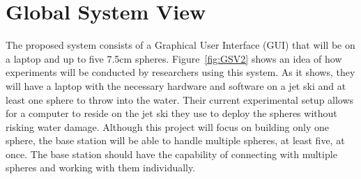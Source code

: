 \section{Global System View}
%
%
%



The proposed system consists of a Graphical User Interface (GUI) that will be on a laptop and up to five 7.5cm spheres.  Figure~\ref{fig:GSV2} shows an idea of how experiments will be conducted by researchers using this system.  As it shows, they will have a laptop with the necessary hardware and software on a jet ski and at least one sphere to throw into the water.  Their current experimental setup allows for a computer to reside on the jet ski they use to deploy the spheres without risking water damage.  Although this project will focus on building only one sphere, the base station will be able to handle multiple spheres, at least five, at once.  The base station should have the capability of connecting with multiple spheres and working with them individually.

